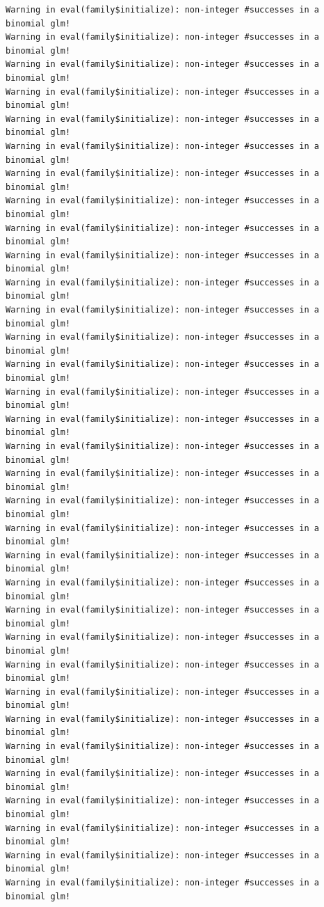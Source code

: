 \documentclass[
  letterpaper,
  DIV=11,
  numbers=noendperiod]{scrartcl}
\begin{document}
\begin{verbatim}
Warning in eval(family$initialize): non-integer #successes in a binomial glm!
Warning in eval(family$initialize): non-integer #successes in a binomial glm!
Warning in eval(family$initialize): non-integer #successes in a binomial glm!
Warning in eval(family$initialize): non-integer #successes in a binomial glm!
Warning in eval(family$initialize): non-integer #successes in a binomial glm!
Warning in eval(family$initialize): non-integer #successes in a binomial glm!
Warning in eval(family$initialize): non-integer #successes in a binomial glm!
Warning in eval(family$initialize): non-integer #successes in a binomial glm!
Warning in eval(family$initialize): non-integer #successes in a binomial glm!
Warning in eval(family$initialize): non-integer #successes in a binomial glm!
Warning in eval(family$initialize): non-integer #successes in a binomial glm!
Warning in eval(family$initialize): non-integer #successes in a binomial glm!
Warning in eval(family$initialize): non-integer #successes in a binomial glm!
Warning in eval(family$initialize): non-integer #successes in a binomial glm!
Warning in eval(family$initialize): non-integer #successes in a binomial glm!
Warning in eval(family$initialize): non-integer #successes in a binomial glm!
Warning in eval(family$initialize): non-integer #successes in a binomial glm!
Warning in eval(family$initialize): non-integer #successes in a binomial glm!
Warning in eval(family$initialize): non-integer #successes in a binomial glm!
Warning in eval(family$initialize): non-integer #successes in a binomial glm!
Warning in eval(family$initialize): non-integer #successes in a binomial glm!
Warning in eval(family$initialize): non-integer #successes in a binomial glm!
Warning in eval(family$initialize): non-integer #successes in a binomial glm!
Warning in eval(family$initialize): non-integer #successes in a binomial glm!
Warning in eval(family$initialize): non-integer #successes in a binomial glm!
Warning in eval(family$initialize): non-integer #successes in a binomial glm!
Warning in eval(family$initialize): non-integer #successes in a binomial glm!
Warning in eval(family$initialize): non-integer #successes in a binomial glm!
Warning in eval(family$initialize): non-integer #successes in a binomial glm!
Warning in eval(family$initialize): non-integer #successes in a binomial glm!
Warning in eval(family$initialize): non-integer #successes in a binomial glm!
Warning in eval(family$initialize): non-integer #successes in a binomial glm!
Warning in eval(family$initialize): non-integer #successes in a binomial glm!
\end{verbatim}
\end{document}
